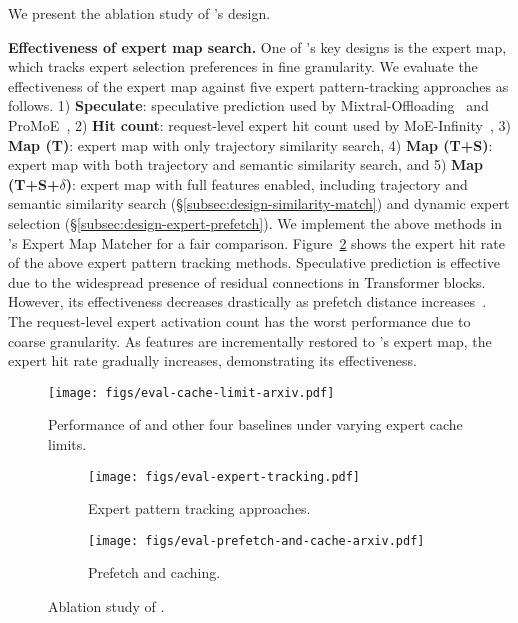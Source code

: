 We present the ablation study of \sys's design.


\textbf{Effectiveness of expert map search.}
One of \sys's key designs is the expert map, which tracks expert selection preferences in fine granularity.
We evaluate the effectiveness of the expert map against five expert pattern-tracking approaches as follows.
%
1) \textbf{Speculate}: speculative prediction used by Mixtral-Offloading~\cite{eliseev2023fast} and ProMoE~\cite{song2024promoe}, 
%
2) \textbf{Hit count}: request-level expert hit count used by MoE-Infinity~\cite{xue2024moe}, 
%
3) \textbf{Map (T)}: expert map with only trajectory similarity search,
4) \textbf{Map (T+S)}: expert map with both trajectory and semantic similarity search,
%
and
5) \textbf{Map (T+S+$\delta$)}: expert map with full features enabled, including trajectory and semantic similarity search (\S\ref{subsec:design-similarity-match}) and dynamic expert selection (\S\ref{subsec:design-expert-prefetch}).
%
We implement the above methods in \sys's Expert Map Matcher for a fair comparison.
Figure~\ref{fig:eval-expert-tracking} shows the expert hit rate of the above expert pattern tracking methods.
%
Speculative prediction is effective due to the widespread presence of residual connections in Transformer blocks. However, its effectiveness decreases drastically as prefetch distance increases~\cite{song2024promoe}.
%
The request-level expert activation count has the worst performance due to coarse granularity.
%
As features are incrementally restored to \sys's expert map, the expert hit rate gradually increases, demonstrating its effectiveness.





\begin{figure}[t]
  \centering
  \texttt{[image: figs/eval-cache-limit-arxiv.pdf]}
  \vspace{-0.15in}
  \caption{Performance of \sys and other four baselines under varying expert cache limits.}
  \vspace{-0.1in}
  \label{fig:eval-cache-limit.pdf}
\end{figure}

\begin{figure}[!t]
    \centering
    \begin{subfigure}[t]{0.585\linewidth}
        \centering
        \texttt{[image: figs/eval-expert-tracking.pdf]}
        \caption{Expert pattern tracking approaches.}
        \label{fig:eval-expert-tracking}
    \end{subfigure}
    \begin{subfigure}[t]{0.385\linewidth}
        \centering
        \texttt{[image: figs/eval-prefetch-and-cache-arxiv.pdf]}
        \caption{Prefetch and caching.}
        \label{fig:eval-prefetch-and-cache}
    \end{subfigure}
    \vspace{-0.1in}
    \caption{Ablation study of \sys.}
    \label{fig:eval-ablation}
    \vspace{-0.2in}
\end{figure}

